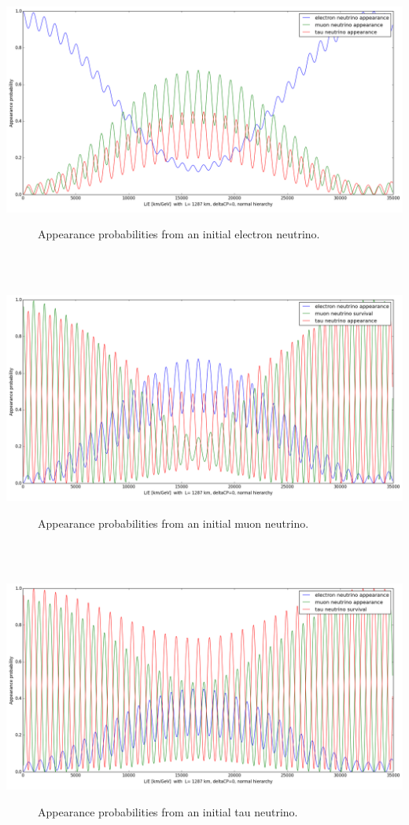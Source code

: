 \documentclass[12pt]{article}
\begin{document}
\begin{center}
\includegraphics[scale=0.4]{electron_appearance.png}
\begin{figure}[h!]
\caption{Appearance probabilities from an initial electron neutrino.}
\label{fig:electron}
\end{figure}
\end{center}\\\\
\begin{center}
\includegraphics[scale=0.4]{muon_appearance.png}
\begin{figure}[h!]
\caption{Appearance probabilities from an initial muon neutrino.}
\label{fig:muon}
\end{figure}
\end{center}\\\\
\begin{center}
\includegraphics[scale=0.4]{tau_appearance.png}
\begin{figure}[h!]
\caption{Appearance probabilities from an initial tau neutrino.}
\label{fig:tau}
\end{figure}\\\\
\end{center}
\end{document}
